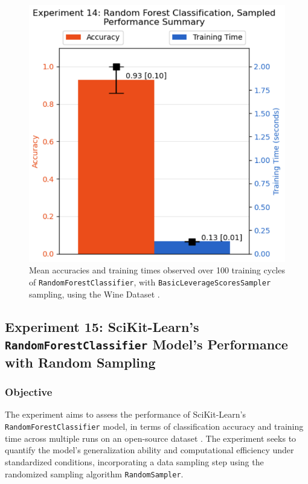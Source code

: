 \documentclass{article}
\theoremstyle{plain}
\theoremstyle{definition}
\theoremstyle{remark}
\begin{document}
\begin{figure}[ht]
	\vskip 0.2in
	\begin{center}
		\centerline{\includegraphics[width=\columnwidth]{experiment_14}}
		\caption{Mean accuracies and training times observed over 100 training cycles of \texttt{RandomForestClassifier}, with \texttt{BasicLeverageScoresSampler} sampling, using the Wine Dataset \cite{wine}.}
		\label{experiment_14}
	\end{center}
	\vskip -0.2in
\end{figure}


\subsection{Experiment 15: SciKit-Learn's \texttt{RandomForestClassifier} Model's Performance with Random Sampling}

\subsubsection{Objective}

The experiment aims to assess the performance of SciKit-Learn's \texttt{RandomForestClassifier} model, in terms of classification accuracy and training time across multiple runs on an open-source dataset \cite{wine}. The experiment seeks to quantify the model's generalization ability and computational efficiency under standardized conditions, incorporating a data sampling step using the randomized sampling algorithm \texttt{RandomSampler}.
\end{document}
